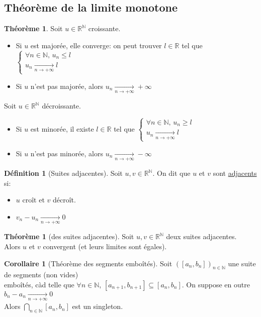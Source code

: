 \documentclass[10pt,a4paper]{article}
\theoremstyle{definition}
\newtheorem{theorem}[proposition]{Théorème}
\newtheorem{corollaire}[proposition]{Corollaire}
\newtheorem{definition}[proposition]{Définition}
\begin{document}
\subsection{Théorème de la limite monotone}
\begin{theorem}
Soit $u \in \mathbb{R}^\mathbb{N}$ croissante.
\begin{itemize}
\item Si $u$ est majorée, elle converge: on peut trouver $l \in \mathbb{R}$ tel que $\begin{cases}\forall n \in \mathbb{N}, \, u_n \leq l \\ u_n \xrightarrow[n \to +\infty]{} l \end{cases}$
\item Si $u$ n'est pas majorée, alors $u_n \xrightarrow[n \to +\infty]{} +\infty$
\end{itemize}
Soit $u \in \mathbb{R}^\mathbb{N}$ décroissante.
\begin{itemize}
\item Si $u$ est minorée, il existe $l \in \mathbb{R}$ tel que $\begin{cases} \forall n \in \mathbb{N}, \, u_n \geq l \\ u_n \xrightarrow[n \to +\infty]{} l \end{cases}$
\item Si $u$ n'est pas minorée, alors $u_n \xrightarrow[n \to +\infty]{} -\infty$
\end{itemize}
\end{theorem}
\begin{definition}[Suites adjacentes]
Soit $u, v \in \mathbb{R}^\mathbb{N}$. On dit que $u$ et $v$ sont \uline{adjacents} si:
\begin{itemize}
\item $u$ croît et $v$ décroît.
\item $v_n - u_n \xrightarrow[n \to +\infty]{} 0$
\end{itemize}
\end{definition}
\begin{theorem}[des suites adjacentes]
Soit $u, v \in \mathbb{R}^\mathbb{N}$ deux suites adjacentes. \\
Alors $u$ et $v$ convergent (et leurs limites sont égales).
\end{theorem}
\begin{corollaire}[Théorème des segments emboîtés]
Soit $\left([a_n, b_n]\right)_{n \in \mathbb{N}}$ une suite de segments (non vides) \\
emboîtés, càd telle que $\forall n \in \mathbb{N}$, $[a_{n + 1}, b_{n + 1}] \subseteq [a_n, b_n]$. On suppose en outre $b_n - a_n \xrightarrow[n \to +\infty]{} 0$ \\
Alors $\bigcap\limits_{n \in \mathbb{N}} [a_n, b_n]$ est un singleton.
\end{corollaire}
\end{document}
